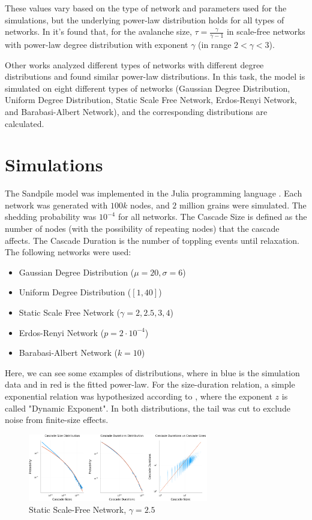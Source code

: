 These values vary based on the type of network and parameters used for the simulations, but the underlying power-law distribution holds for all types of networks.
In \cite{scale_free_sandpile} it's found that, for the avalanche size, $\tau = \frac{\gamma}{\gamma -1}$ in scale-free networks with power-law degree distribution with exponent $\gamma$ (in range $2 < \gamma < 3$).

Other works \cite{random_graph_sandpile} analyzed different types of networks with different degree distributions and found similar power-law distributions.
In this task, the model is simulated on eight different types of networks (Gaussian Degree Distribution, Uniform Degree Distribution, Static Scale Free Network, Erdos-Renyi Network, and Barabasi-Albert Network), and the corresponding distributions are calculated.

\section{Simulations}

The Sandpile model was implemented in the Julia programming language \cite{julia}. Each network was generated with $100k$ nodes, and $2$ million grains were simulated. The shedding probability was $10^{-4}$ for all networks. The Cascade Size is defined as the number of nodes (with the possibility of repeating nodes) that the cascade affects. The Cascade Duration is the number of toppling events until relaxation.
The following networks were used:
\begin{itemize}
    \item Gaussian Degree Distribution ($\mu = 20, \sigma = 6$)
    \item Uniform Degree Distribution ($[1,40]$)
    \item Static Scale Free Network ($\gamma = 2, 2.5, 3, 4$) \cite{scale_free_generation}
    \item Erdos-Renyi Network ($p = 2\cdot 10^{-4}$)
    \item Barabasi-Albert Network ($k = 10$)
\end{itemize}

Here, we can see some examples of distributions, where in blue is the simulation data and in red is the fitted power-law. For the size-duration relation, a simple exponential relation was hypothesized according to \cite{scale_free_sandpile}, where the exponent $z$ is called "Dynamic Exponent".
In both distributions, the tail was cut to exclude noise from finite-size effects.
    \begin{figure}[H]
        \centering
        \includegraphics[width=0.7\textwidth]{images/Task15/StaticScaleFree25.png}
        \caption{Static Scale-Free Network, $\gamma = 2.5$}
    \end{figure}
    
